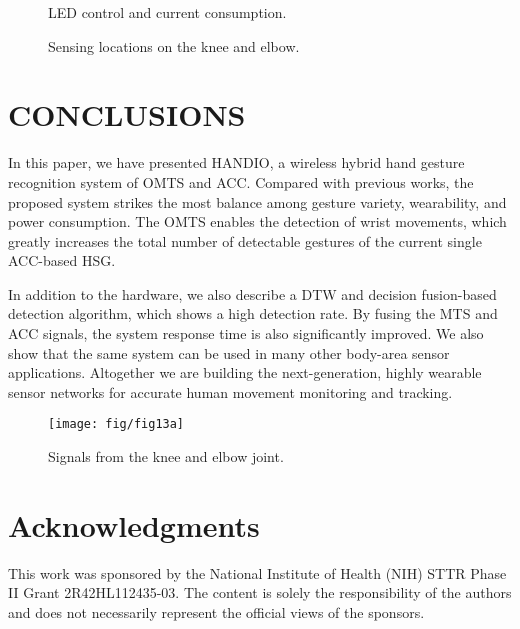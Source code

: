 \begin{figure}[t]
\centering
{}
\caption{LED control and current consumption.}
\end{figure}

\begin{figure}[t]
\centering
{}
\caption{Sensing locations on the knee and elbow.}
\end{figure}

\section{CONCLUSIONS}
In this paper, we have presented HANDIO, a wireless
hybrid hand gesture recognition system of OMTS and ACC.
Compared with previous works, the proposed system strikes
the most balance among gesture variety, wearability, and power
consumption. The OMTS enables the detection of wrist movements,
which greatly increases the total number of detectable
gestures of the current single ACC-based HSG.

In addition to the hardware, we also describe a DTW
and decision fusion-based detection algorithm, which shows
a high detection rate. By fusing the MTS and ACC signals,
the system response time is also significantly improved. We
also show that the same system can be used in many other
body-area sensor applications. Altogether we are building the
next-generation, highly wearable sensor networks for accurate
human movement monitoring and tracking.

\begin{figure}[t]
\centering
\texttt{[image: fig/fig13a]}
\caption{Signals from the knee and elbow joint.}
\end{figure}

\section*{Acknowledgments}
This work was sponsored by the National Institute of
Health (NIH) STTR Phase II Grant 2R42HL112435-03. The
content is solely the responsibility of the authors and does not
necessarily represent the official views of the sponsors.
